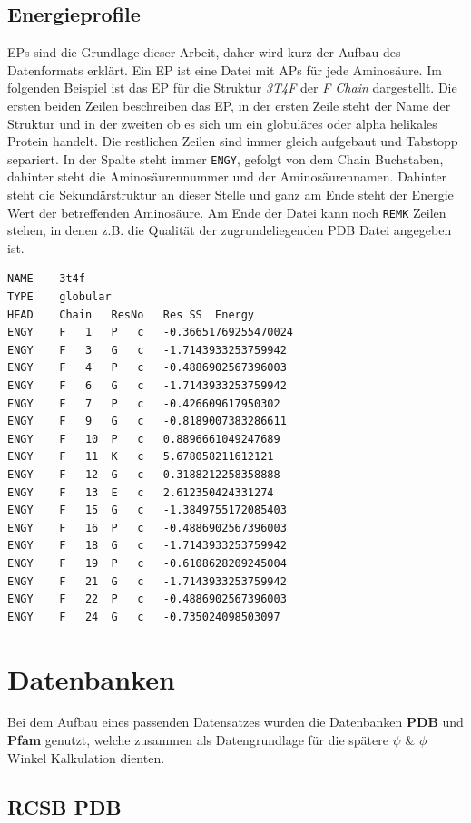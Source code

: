 \subsection{Energieprofile}
\label{sec:Energieprofil}
\acf{EPs} sind die Grundlage dieser Arbeit, daher wird kurz der Aufbau des Datenformats erklärt. Ein \ac{EP} ist eine Datei mit \ac{APs} für jede Aminosäure. Im folgenden Beispiel ist das EP für die Struktur \emph{3T4F} der \emph{F Chain} dargestellt. Die ersten beiden Zeilen beschreiben das \ac{EP}, in der ersten Zeile steht der Name der Struktur und in der zweiten ob es sich um ein globuläres oder alpha helikales Protein handelt. Die restlichen Zeilen sind immer gleich aufgebaut und Tabstopp separiert. In der Spalte steht immer \texttt{ENGY}, gefolgt von dem Chain Buchstaben, dahinter steht die Aminosäurennummer und der Aminosäurennamen. Dahinter steht die Sekundärstruktur an dieser Stelle und ganz am Ende steht der Energie Wert der betreffenden Aminosäure. Am Ende der Datei kann noch \texttt{REMK} Zeilen stehen, in denen z.B. die Qualität der zugrundeliegenden \ac{PDB} Datei angegeben ist.

\begin{lstlisting}
NAME	3t4f
TYPE	globular
HEAD	Chain	ResNo	Res	SS	Energy
ENGY	F	1	P	c	-0.36651769255470024
ENGY	F	3	G	c	-1.7143933253759942
ENGY	F	4	P	c	-0.4886902567396003
ENGY	F	6	G	c	-1.7143933253759942
ENGY	F	7	P	c	-0.426609617950302
ENGY	F	9	G	c	-0.8189007383286611
ENGY	F	10	P	c	0.8896661049247689
ENGY	F	11	K	c	5.678058211612121
ENGY	F	12	G	c	0.3188212258358888
ENGY	F	13	E	c	2.612350424331274
ENGY	F	15	G	c	-1.3849755172085403
ENGY	F	16	P	c	-0.4886902567396003
ENGY	F	18	G	c	-1.7143933253759942
ENGY	F	19	P	c	-0.6108628209245004
ENGY	F	21	G	c	-1.7143933253759942
ENGY	F	22	P	c	-0.4886902567396003
ENGY	F	24	G	c	-0.735024098503097
\end{lstlisting}


\section{Datenbanken}
Bei dem Aufbau eines passenden Datensatzes wurden die Datenbanken \textbf{PDB} und \textbf{Pfam} genutzt, welche zusammen als Datengrundlage für die spätere $\psi$ \& $\phi$ Winkel Kalkulation dienten. 


\subsection{RCSB PDB}

